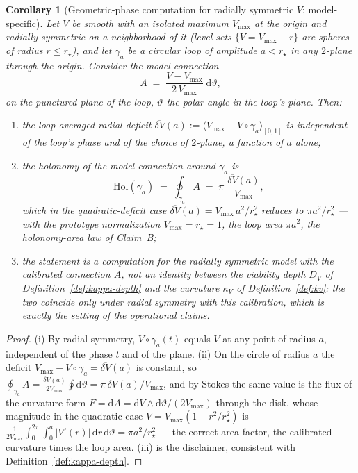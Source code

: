 \documentclass[11pt,a4paper]{article}
\theoremstyle{plain}
\newtheorem{corollary}[theorem]{Corollary}
\theoremstyle{definition}
\theoremstyle{remark}
\newcommand{\kk}{\kappa_{\!V}}
\begin{document}
\begin{corollary}[Geometric-phase computation for radially symmetric
$V$; model-specific]\label{cor:kappa-geometric-phase}
Let $V$ be smooth with an isolated maximum $V_{\max}$ at the origin
and radially symmetric on a neighborhood of it (level sets
$\{V = V_{\max} - r\}$ are spheres of radius $r \le r_\star$), and
let $\gamma_a$ be a circular loop of amplitude $a < r_\star$ in any
$2$-plane through the origin. Consider the model connection
\[
A \;=\; \frac{V - V_{\max}}{2\,V_{\max}}\;\mathrm{d}\vartheta,
\]
on the punctured plane of the loop, $\vartheta$ the polar angle in
the loop's plane. Then:
\begin{enumerate}[leftmargin=*,itemsep=1pt]
\item the loop-averaged radial deficit
$\overline{\delta V}(a) := \langle V_{\max} - V \circ
\gamma_a\rangle_{[0,1]}$ is independent of the loop's phase and of
the choice of $2$-plane, a function of $a$ alone;
\item the holonomy of the model connection around $\gamma_a$ is
\begin{equation}\label{eq:kappa-radial}
  \mathrm{Hol}(\gamma_a) \;=\; \oint_{\gamma_a} A \;=\;
  \pi\;\frac{\overline{\delta V}(a)}{V_{\max}},
\end{equation}
which in the quadratic-deficit case
$\overline{\delta V}(a) = V_{\max}\,a^{2}/r_\star^{2}$ reduces to
$\pi a^{2}/r_\star^{2}$ --- with the prototype normalization
$V_{\max} = r_\star = 1$, the loop area $\pi a^{2}$, the
holonomy-area law of Claim~B;
\item the statement is a computation for the radially symmetric model
with the calibrated connection $A$, not an identity between the
viability depth $D_V$ of Definition~\ref{def:kappa-depth} and the
curvature $\kk$ of Definition~\ref{def:kv}: the two coincide only
under radial symmetry with this calibration, which is exactly the
setting of the operational claims.
\end{enumerate}
\end{corollary}

\begin{proof}
(i) By radial symmetry, $V \circ \gamma_a(t)$ equals $V$ at any
point of radius $a$, independent of the phase $t$ and of the plane.
(ii) On the circle of radius $a$ the deficit
$V_{\max} - V \circ \gamma_a = \overline{\delta V}(a)$ is constant,
so $\oint_{\gamma_a} A = \frac{\overline{\delta V}(a)}{2V_{\max}}
\oint \mathrm{d}\vartheta = \pi\,\overline{\delta V}(a)/V_{\max}$,
and by Stokes the same value is the flux of the curvature form
$F = \mathrm{d}A = \mathrm{d}V \wedge \mathrm{d}\vartheta/(2V_{\max})
$ through the disk, whose magnitude in the quadratic case
$V = V_{\max}(1 - r^2/r_\star^2)$ is
$\tfrac{1}{2V_{\max}}\int_{0}^{2\pi}\!\!\int_{0}^{a} |V'(r)|\,
\mathrm{d}r\,\mathrm{d}\vartheta = \pi a^2/r_\star^{2}$ --- the
correct area factor, the calibrated curvature times the loop area.
(iii) is the disclaimer, consistent with
Definition~\ref{def:kappa-depth}.
\end{proof}
\end{document}
